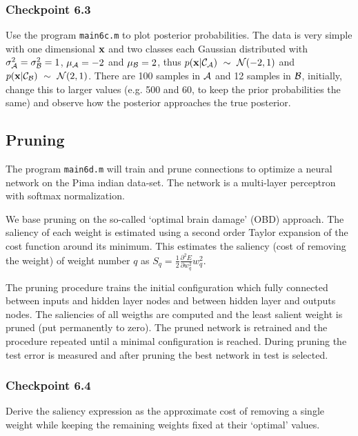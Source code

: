 \documentclass[12pt]{article}    %
\def\x{{\bf x}}
\begin{document}
\subsubsection*{Checkpoint 6.3}

Use the program {\tt main6c.m} to plot posterior probabilities.
The data is very simple with one dimensional $\x$ and two classes each Gaussian distributed with
$\sigma_{\cal A}^2=\sigma_{\cal B}^2=1$, $\mu_{\cal A} = -2$ and
$\mu_{\cal B}=2$, thus
$p(\x|{\cal C}_{\cal A})~\sim~{\cal N}(-2,1)$ and $p(\x|{\cal C}_{\cal B})~\sim~{\cal N}(2,1)$.
There are 100 samples in ${\cal A}$ and 12 samples in ${\cal B}$, initially,
 change this to larger values (e.g. 500 and 60, to keep the prior probabilities
 the same) and observe how the posterior approaches
 the true posterior.

\subsection*{Pruning}

The program {\tt main6d.m} will train and prune connections to optimize a neural network on
the Pima indian data-set.
The network is a multi-layer perceptron with softmax normalization.

We base pruning on the so-called `optimal brain damage' (OBD) approach. The saliency of each
weight is estimated using a second order Taylor expansion of the cost function around its
minimum. This estimates the saliency (cost of removing the weight) of weight number $q$ as
$S_{q} = \frac{1}{2}\frac{\partial^2 E}{\partial w_{q}^2}w_{q}^2$.

The pruning procedure trains the initial configuration which fully connected between
inputs and hidden layer nodes and between hidden layer and outputs nodes. The saliencies of all weigths
are computed and the least salient weight is pruned (put permanently to zero). The pruned network
is retrained and the procedure repeated until a minimal configuration is reached. During
pruning the test error is measured and after pruning the best network in test
is selected.



\subsubsection*{Checkpoint 6.4}
Derive the saliency expression as the approximate cost of removing a single weight while keeping
the remaining weights fixed at their `optimal' values.
\end{document}
